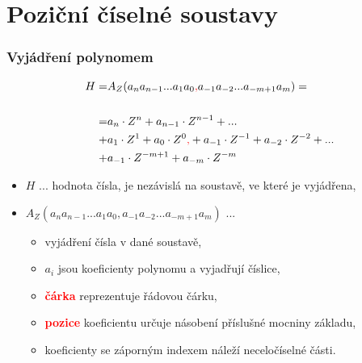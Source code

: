 \section{\texorpdfstring{Poziční číselné soustavy}{Pozicni ciselne soustavy}}

	\begin{frame}
    \frametitle{Vyjádření polynomem}

		\begin{minipage}[t][0.4\textheight][t]{\textwidth}
      \small
			\boldmath
			\begin{align*}
			H =& A_{Z}(a_{n} a_{n-1} ... a_{1} a_{0}\textcolor{red}{,} a_{-1} a_{-2} ... a_{-m+1} a_{m}) =\\ \\
				=& a_{n} \cdot Z^n + a_{n-1} \cdot Z^{n-1} + ...\\ 
				+& a_{1} \cdot Z^1 + a_{0} \cdot Z^0\textcolor{red}{,} + a_{-1} \cdot Z^{-1} + a_{-2} \cdot Z^{-2} + ...\\ 
				+& a_{-1} \cdot Z^{-m+1} + a_{-m} \cdot Z^{-m}
			\end{align*}
		\end{minipage}
		
		\begin{minipage}[t][0.5\textheight][t]{\textwidth}
			\boldmath
			\begin{itemize}
				\item $H$ ... hodnota čísla, je nezávislá na soustavě, ve které je vyjádřena,		
				
				\item $A_{Z}(a_{n} a_{n-1} ... a_{1} a_{0}, a_{-1} a_{-2} ... a_{-m+1} a_{m})$ ...
					\begin{itemize}
						\item vyjádření čísla v dané soustavě,
						\item $a_{i}$ jsou koeficienty polynomu a vyjadřují číslice,
						\item \textcolor{red}{\textbf{čárka}} reprezentuje řádovou čárku,
						\item \textcolor{red}{\textbf{pozice}} koeficientu určuje násobení příslušné mocniny základu,
						\item koeficienty se záporným indexem náleží neceločíselné části.
					\end{itemize}
			\end{itemize}
		\end{minipage}
		
	\end{frame}

